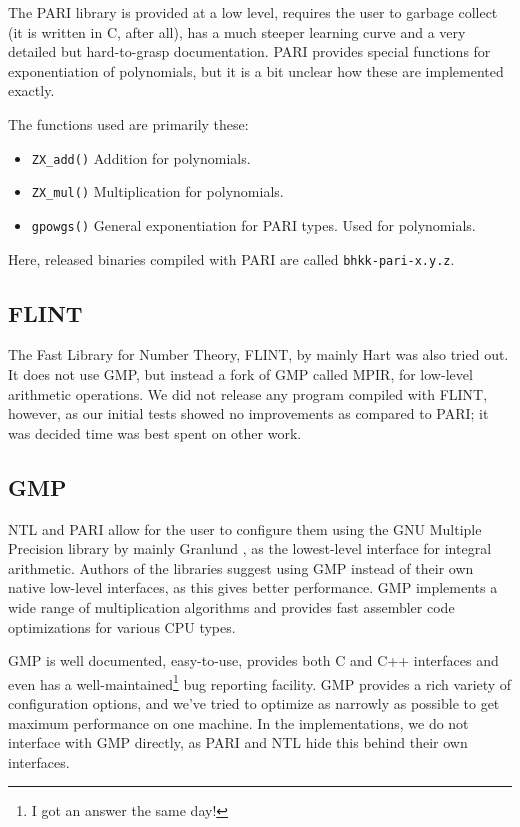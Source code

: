 \documentclass{cslthse-msc}
\newcommand{\code}{\texttt}
\begin{document}
The PARI library is provided at a low level, requires the user to garbage collect (it is written in C, after all), has a much steeper learning curve and a very detailed but hard-to-grasp documentation. PARI provides special functions for exponentiation of polynomials, but it is a bit unclear how these are implemented exactly.

The functions used are primarily these: 

\begin{itemize}
\item \code{ZX\_add()}
\subitem Addition for polynomials. %
\item \code{ZX\_mul()}
\subitem Multiplication for polynomials. %
\item \code{gpowgs()}
\subitem General exponentiation for PARI types. Used for polynomials.
\end{itemize}

Here, released binaries compiled with PARI are called \code{bhkk-pari-x.y.z}.

\subsection{FLINT}
The Fast Library for Number Theory, FLINT, by mainly Hart \cite{flint} was also tried out. It does not use GMP, but instead a fork of GMP called MPIR, for low-level arithmetic operations. We did not release any program compiled with FLINT, however, as our initial tests showed no improvements as compared to PARI; it was decided time was best spent on other work.

\subsection{GMP}
NTL and PARI allow for the user to configure them using the GNU Multiple Precision library by mainly Granlund \cite{gmp}, as the lowest-level interface for integral arithmetic. Authors of the libraries suggest using GMP instead of their own native low-level interfaces, as this gives better performance. GMP implements a wide range of multiplication algorithms and provides fast assembler code optimizations for various CPU types.

GMP is well documented, easy-to-use, provides both C and C++ interfaces and even has a well-maintained\footnote{I got an answer the same day!} bug reporting facility. GMP provides a rich variety of configuration options, and we've tried to optimize as narrowly as possible to get maximum performance on one machine. In the implementations, we do not interface with GMP directly, as PARI and NTL hide this behind their own interfaces.
\end{document}
